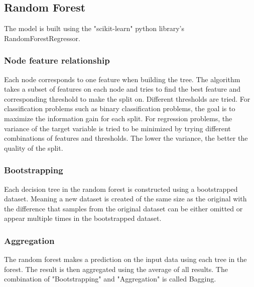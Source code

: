 \documentclass{article}
\begin{document}
\subsection{Random Forest}
The model is built using the "scikit-learn" python library's RandomForestRegressor.
\subsubsection{Node feature relationship}
Each node corresponds to one feature when building the tree. The algorithm takes a subset of features on each node and tries to find the best feature and corresponding threshold to make the split on. Different thresholds are tried. For classification problems such as binary classification problems, the goal is to maximize the information gain for each split.
For regression problems, the variance of the target variable is tried to be minimized by trying different combinations of features and thresholds. The lower the variance, the better the quality of the split.
\subsubsection{Bootstrapping}
Each decision tree in the random forest is constructed using a bootstrapped dataset. Meaning a new dataset is created of the same size as the original with the difference that samples from the original dataset can be either omitted or appear multiple times in the bootstrapped dataset.
\subsubsection{Aggregation}
The random forest makes a prediction on the input data using each tree in the forest. The result is then aggregated using the average of all results.
The combination of "Bootstrapping" and "Aggregation" is called Bagging.
\end{document}
